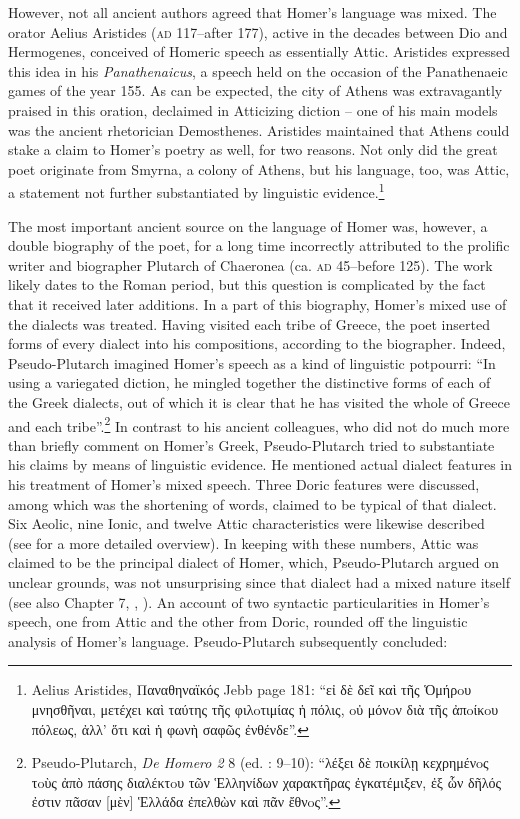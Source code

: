 However, not all ancient authors agreed that Homer’s language was mixed. The orator Aelius Aristides (\textsc{ad} 117–after 177), active in the decades between Dio and Hermogenes, conceived of Homeric speech as essentially Attic. Aristides expressed this idea in his \textit{Panathenaicus}, a speech held on the occasion of the Panathenaeic games of the year 155. As can be expected, the city of Athens was extravagantly praised in this oration, declaimed in Atticizing diction – one of his main models was the ancient rhetorician Demosthenes. Aristides maintained that Athens could stake a claim to Homer’s poetry as well, for two reasons. Not only did the great poet originate from Smyrna, a colony of Athens, but his language, too, was Attic, a statement not further substantiated by linguistic evidence.\footnote{Aelius Aristides, Παναθηναϊκός Jebb page 181: “εἰ δὲ δεῖ καὶ τῆς Ὁμήρoυ μνησθῆναι, μετέχει καὶ ταύτης τῆς φιλoτιμίας ἡ πόλις, oὐ μόνoν διὰ τῆς ἀπoίκoυ πόλεως, ἀλλ’ ὅτι καὶ ἡ φωνὴ σαφῶς ἐνθένδε”.}

The most important ancient source on the language of Homer was, however, a double biography of the poet, for a long time incorrectly attributed to the prolific writer and biographer Plutarch of Chaeronea (ca. \textsc{ad} 45–before 125). The work likely dates to the Roman period, but this question is complicated by the fact that it received later additions. In a part of this biography, Homer’s mixed use of the dialects was treated. Having visited each tribe of Greece, the poet inserted forms of every dialect into his compositions, according to the biographer. Indeed, Pseudo-Plutarch imagined Homer’s speech as a kind of linguistic potpourri: “In using a variegated diction, he mingled together the distinctive forms of each of the Greek dialects, out of which it is clear that he has visited the whole of Greece and each tribe”.\footnote{Pseudo-Plutarch, \textit{De Homero 2} 8 (ed. \citealt{Kindstrand1990}: 9–10): “λέξει δὲ πoικίλῃ κεχρημένoς τoὺς ἀπὸ πάσης διαλέκτoυ τῶν Ἑλληνίδων χαρακτῆρας ἐγκατέμιξεν, ἐξ ὧν δῆλός ἐστιν πᾶσαν [μὲν] Ἑλλάδα ἐπελθὼν καὶ πᾶν ἔθνoς”.} In contrast to his ancient colleagues, who did not do much more than briefly comment on Homer’s Greek, Pseudo-Plutarch tried to substantiate his claims by means of linguistic evidence. He mentioned actual dialect features in his treatment of Homer’s mixed speech. Three Doric features were discussed, among which was the shortening of words, claimed to be typical of that dialect. Six Aeolic, nine Ionic, and twelve Attic characteristics were likewise described (see \citealt{VanRooy2018c} for a more detailed overview). In keeping with these numbers, Attic was claimed to be the principal dialect of Homer, which, Pseudo-Plutarch argued on unclear grounds, was not unsurprising since that dialect had a mixed nature itself (see also Chapter 7, , ). An account of two syntactic particularities in Homer’s speech, one from Attic and the other from Doric, rounded off the linguistic analysis of Homer’s language. Pseudo-Plutarch subsequently concluded:


